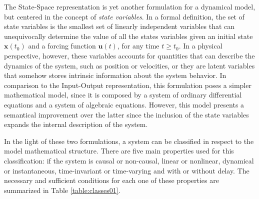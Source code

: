 \documentclass[a4paper,11pt]{book}
\numberwithin{figure}{chapter}
\numberwithin{equation}{chapter}
\numberwithin{table}{chapter}
\theoremstyle{definition}
\begin{document}
The State-Space representation is yet another formulation for a dynamical model, but centered in the concept of \textit{state variables}. In a formal definition, the set of state variables is the smallest set of linearly independent variables that can unequivocally determine the value of all the states variables given an initial state $\bm{x}(t_0)$ and a forcing function $\bm{u}(t)$, for any time $t \geq t_0$. In a physical perspective, however, these variables accounts for quantities that can describe the dynamics of the system, such as position or velocities, or they are latent variables that somehow stores intrinsic information about the system behavior. In comparison to the Input-Output representation, this formulation poses a simpler mathematical model, since it is composed by a system of ordinary differential equations and a system of algebraic equations. However, this model presents a semantical improvement over the latter since the inclusion of the state variables expands the internal description of the system. 

In the light of these two formulations, a system can be classified in respect to the model mathematical structure. There are five main properties used for this classification: if the system is causal or non-causal, linear or nonlinear, dynamical or instantaneous, time-invariant or time-varying and with or without delay. The necessary and sufficient conditions for each one of these properties are summarized in Table \ref{table:classes01}.
\end{document}
